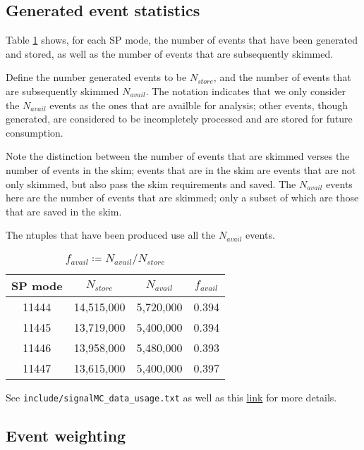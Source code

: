 \documentclass{article}
\renewcommand{\(}{\left(}
\renewcommand{\)}{\right)}
\numberwithin{equation}{section}
\begin{document}
\subsection{Generated event statistics}
Table \ref{sigmc_generated} shows, for each SP mode, the number of events that have been generated and stored, as well as the number of events that are subsequently skimmed. 

Define the number generated events to be $N_{store}$, and the number of events that are subsequently skimmed $N_{avail}$. The notation indicates that we only consider the $N_{avail}$ events as the ones that are availble for analysis; other events, though generated, are considered to be incompletely processed and are stored for future consumption. 

Note the distinction between the number of events that are skimmed verses the number of events in the skim; events that are in the skim are events that are not only skimmed, but also pass the skim requirements and saved. The $N_{avail}$ events here are the number of events that are skimmed; only a subset of which are those that are saved in the skim.

The ntuples that have been produced use all the $N_{avail}$ events. 

\begin{table}[H]
  \begin{center}
    \begin{tabular}{ c c c c }
      SP mode & $N_{store}$ & $N_{avail}$ & $f_{avail}$ \\
      \hline\hline
      11444 & 14,515,000 & 5,720,000 & 0.394 \\
      \hline
      11445 & 13,719,000 & 5,400,000 & 0.394 \\
      \hline
      11446 & 13,958,000 & 5,480,000 & 0.393 \\
      \hline
      11447 & 13,615,000 & 5,400,000 & 0.397 \\
      \hline
    \end{tabular}
  \end{center}
  \caption{$f_{avail}\coloneqq N_{avail}/N_{store}$}
  \label{sigmc_generated}
\end{table}

See \verb!include/signalMC_data_usage.txt! as well as this \href{https://bbr-wiki.slac.stanford.edu/bbr_wiki/index.php/Physics_analysis/BtoDtaunu_SLtag/signalMCProd}{link} for more details.




\subsection{Event weighting}
\end{document}
